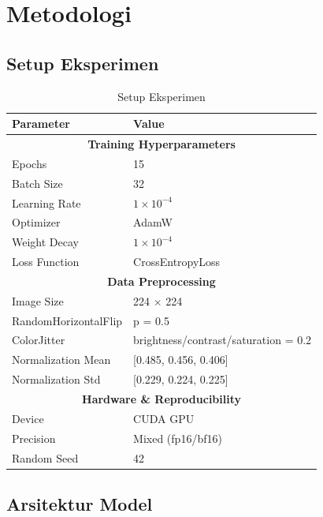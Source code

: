 \section{Metodologi}

\subsection{Setup Eksperimen}
\begin{table}[h]
\centering
\caption{Setup Eksperimen}
\scriptsize
\begin{tabular}{|l|l|}
\hline
\textbf{Parameter} & \textbf{Value} \\
\hline
\multicolumn{2}{|c|}{\textbf{Training Hyperparameters}} \\
\hline
Epochs & 15 \\
Batch Size & 32 \\
Learning Rate & $1 \times 10^{-4}$ \\
Optimizer & AdamW \\
Weight Decay & $1 \times 10^{-4}$ \\
Loss Function & CrossEntropyLoss \\
\hline
\multicolumn{2}{|c|}{\textbf{Data Preprocessing}} \\
\hline
Image Size & 224 $\times$ 224 \\
RandomHorizontalFlip & p = 0.5 \\
ColorJitter & brightness/contrast/saturation = 0.2 \\
Normalization Mean & [0.485, 0.456, 0.406] \\
Normalization Std & [0.229, 0.224, 0.225] \\
\hline
\multicolumn{2}{|c|}{\textbf{Hardware \& Reproducibility}} \\
\hline
Device & CUDA GPU \\
Precision & Mixed (fp16/bf16) \\
Random Seed & 42 \\
\hline
\end{tabular}
\end{table}

\subsection{Arsitektur Model}

